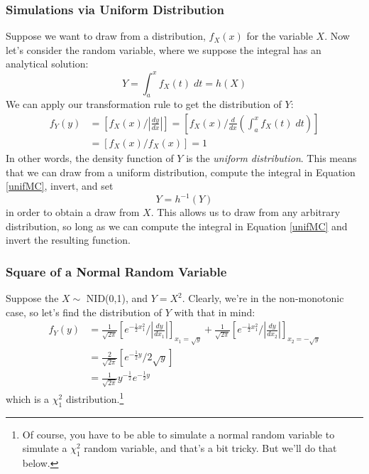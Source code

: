 \documentclass[a4paper,12pt]{scrartcl}
\begin{document}
\subsubsection{Simulations via Uniform Distribution}

Suppose we want to draw from a distribution, $f_X(x)$ for the variable
$X$. Now let's consider the random variable, where we suppose
the integral has an analytical solution:
\begin{equation}
   \label{unifMC}
   Y = \int^x_a f_X(t) \; dt = h(X)
\end{equation}
We can apply our transformation rule to get the distribution of $Y$:
\begin{align*}
    f_Y(y) &= \left[ f_X(x) / \left\lvert\frac{dy}{dx} \right\rvert
       \right] =\left[ f_X(x) / \frac{d}{dx} \left( \int^x_a
	  f_X(t)\; dt\right) \right] \\
      &=\left[ f_X(x) / f_X(x) \right]  = 1
\end{align*}
In other words, the density function of $Y$ is the \emph{uniform
distribution}. This means that we can draw from a uniform
distribution, compute the integral in Equation \ref{unifMC}, invert,
and set
   \[ Y = h^{-1}(Y) \]
in order to obtain a draw from $X$. This allows us to draw from
any arbitrary distribution, so long as we can compute the integral
in Equation \ref{unifMC} and invert the resulting function.



\subsubsection{Square of a Normal Random Variable}

Suppose the $X\sim$ NID(0,1), and $Y = X^2$. Clearly, we're in
the non-monotonic case, so let's find the distribution of $Y$ with
that in mind:
\begin{align*}
   f_Y(y) &= \frac{1}{\sqrt{2\pi}} \left[ e^{-\frac{1}{2}x_1^2}/
      \left\lvert \frac{dy}{dx_1}\right\rvert \right]_{x_1 = \sqrt{y}} +
      \frac{1}{\sqrt{2\pi}} \left[ e^{-\frac{1}{2}x_1^2}/
      \left\lvert \frac{dy}{dx_2}\right\rvert \right]_{x_2 =-\sqrt{y}}\\
   &= \frac{2}{\sqrt{2\pi}} \left[ e^{-\frac{1}{2} y} / 2\sqrt{y}
      \right ] \\
   &= \frac{1}{\sqrt{2\pi}} y^{-\frac{1}{2}} e^{-\frac{1}{2} y}
\end{align*}
which is a $\chi^2_1$ distribution.\footnote{Of course, you have
to be able to simulate a normal random variable to simulate a
$\chi^2_1$ random variable, and that's a bit tricky. But we'll do
that below.}
\end{document}
